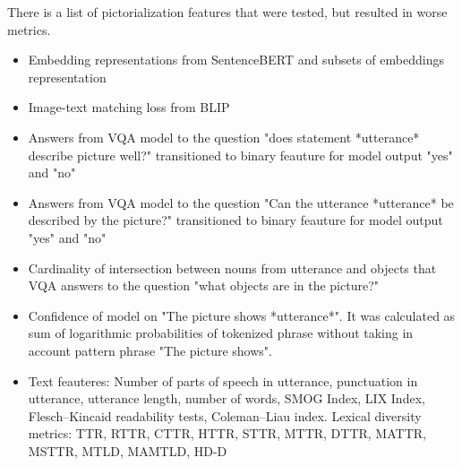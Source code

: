 There is a list of pictorialization features that were tested, but resulted in worse metrics. 
\begin{itemize}
    \item Embedding representations from SentenceBERT and subsets of embeddings representation
    \item Image-text matching loss from BLIP
    \item Answers from VQA model to the question "does statement *utterance* describe picture well?" transitioned to binary feauture for model output "yes" and "no" 
    \item Answers from VQA model to the question "Can the utterance *utterance* be described by the picture?" transitioned to binary feauture for model output "yes" and "no" 
    \item Cardinality of intersection between nouns from utterance and objects that VQA answers to the question "what objects are in the picture?"
    \item Confidence of model on "The picture shows *utterance*". It was calculated as sum of logarithmic probabilities of tokenized phrase without taking in account pattern phrase "The picture shows".
    \item Text feauteres: Number of parts of speech in utterance, punctuation in utterance, utterance length, number of words, SMOG Index, LIX Index, Flesch–Kincaid readability tests, Coleman–Liau index. Lexical diversity metrics: TTR, RTTR, CTTR, HTTR, STTR, MTTR, DTTR, MATTR, MSTTR, MTLD, MAMTLD, HD-D \cite{ruTS}
\end{itemize}

